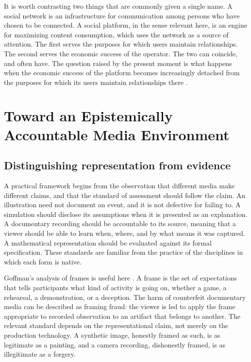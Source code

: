 \documentclass[12pt]{article}
\theoremstyle{plain}
\theoremstyle{definition}
\theoremstyle{remark}
\begin{document}
It is worth contrasting two things that are commonly given a single name. A social network is an infrastructure for communication among persons who have chosen to be connected. A social platform, in the sense relevant here, is an engine for maximizing content consumption, which uses the network as a source of attention. The first serves the purposes for which users maintain relationships. The second serves the economic success of the operator. The two can coincide, and often have. The question raised by the present moment is what happens when the economic success of the platform becomes increasingly detached from the purposes for which its users maintain relationships there \cite{gillespie2018}.

\section{Toward an Epistemically Accountable Media Environment}

\subsection{Distinguishing representation from evidence}

A practical framework begins from the observation that different media make different claims, and that the standard of assessment should follow the claim. An illustration need not document an event, and it is not defective for failing to. A simulation should disclose its assumptions when it is presented as an explanation. A documentary recording should be accountable to its source, meaning that a viewer should be able to learn when, where, and by what means it was captured. A mathematical representation should be evaluated against its formal specification. These standards are familiar from the practice of the disciplines in which each form is native.

Goffman's analysis of frames is useful here \cite{goffman1974}. A frame is the set of expectations that tells participants what kind of activity is going on, whether a game, a rehearsal, a demonstration, or a deception. The harm of counterfeit documentary media can be described as framing fraud: the viewer is led to apply the frame appropriate to recorded observation to an artifact that belongs to another. The relevant standard depends on the representational claim, not merely on the production technology. A synthetic image, honestly framed as such, is as legitimate as a painting, and a camera recording, dishonestly framed, is as illegitimate as a forgery.
\end{document}
